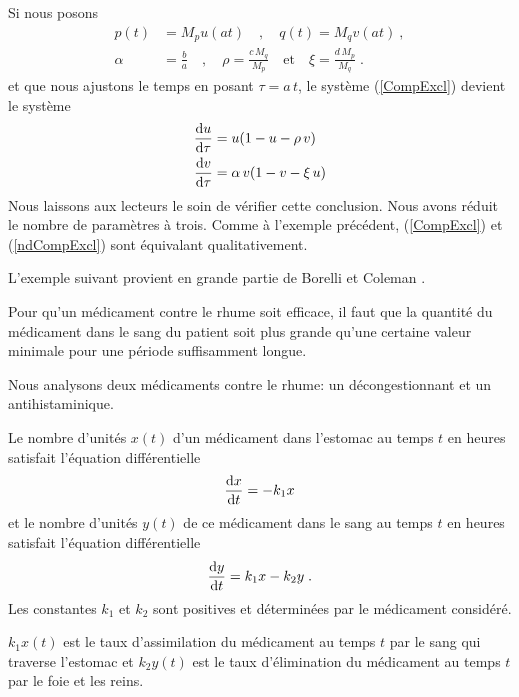 {\begin{egg}
Si nous posons
\begin{align*}
  p(t) &= M_p u(a t) \quad , \quad q(t) = M_q v(a t) \ ,\\
\alpha &= \frac{b}{a} \quad , \quad  \rho = \frac{c\,M_q}{M_p}
\quad \text{et} \quad \xi = \frac{d\,M_p}{M_q} \; .
\end{align*}
et que nous ajustons le temps en posant $\tau = a\,t$, le système
(\ref{CompExcl}) devient le système
\begin{equation} \label{ndCompExcl}
\begin{split}
\frac{\mathrm{d}u}{\mathrm{d}\tau} &= u(1-u - \rho\,v) \\
\frac{\mathrm{d}v}{\mathrm{d}\tau} &= \alpha \,v(1-v-\xi\,u)
\end{split}
\end{equation}
Nous laissons aux lecteurs le soin de vérifier cette conclusion.
Nous avons réduit le nombre de paramètres à trois.  Comme à l'exemple précédent,
(\ref{CompExcl}) et (\ref{ndCompExcl}) sont équivalant
qualitativement.
\end{egg}

\begin{egg}
L'exemple suivant provient en grande partie de Borelli et Coleman \cite{BC}.

Pour qu'un médicament contre le rhume soit efficace, il faut que la quantité
du médicament dans le sang du patient soit plus grande qu'une certaine
valeur minimale pour une période suffisamment longue.

Nous analysons deux médicaments contre le rhume: un décongestionnant et un
antihistaminique.


Le nombre d'unités $x(t)$ d'un médicament dans l'estomac au temps $t$ en
heures satisfait l'équation différentielle 
\begin{equation}\label{dose1}
\frac{\mathrm{d}x}{\mathrm{d}t} = -k_1 x
\end{equation}
et le nombre d'unités $y(t)$ de ce médicament dans le sang au temps $t$ en
heures satisfait l'équation différentielle 
\begin{equation}\label{dose2}
\frac{\mathrm{d}y}{\mathrm{d}t} = k_1 x - k_2 y \; .
\end{equation}
Les constantes $k_1$ et $k_2$ sont positives et déterminées par le médicament
considéré.

$k_1 x(t)$ est le taux d'assimilation du médicament au temps $t$ par le sang
qui traverse l'estomac et $k_2y(t)$ est le taux d'élimination du médicament
au temps $t$ par le foie et les reins.


\end{egg}}
